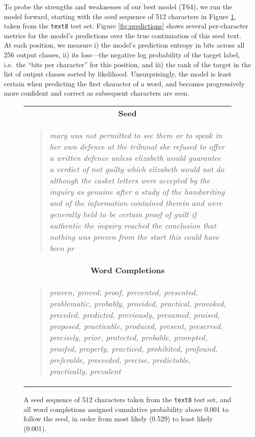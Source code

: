 \documentclass[letterpaper]{article}
\newcommand{\texteight}{\texttt{text8}}
\newcommand{\bigmodel}{\textsc{T64}}
\newcommand{\corpus}[1]{\begin{quote}{\small \emph{#1}}\end{quote}}
\begin{document}
To probe the strengths and weaknesses of our best model (\bigmodel), we run the model forward, starting with the seed sequence of 512 characters in Figure \ref{fig:completions}, taken from the \texteight{} test set.
Figure \ref{fig:predictions} shows several per-character metrics for the model's predictions over the true continuation of this seed text.
At each position, we measure i) the model's prediction entropy in bits across all 256 output classes, ii) its loss---the negative log probability of the target label, i.e.~the ``bits per character'' for this position, and iii) the rank of the target in the list of output classes sorted by likelihood.
Unsurprisingly, the model is least certain when predicting the first character of a word, and becomes progressively more confident and correct as subsequent characters are seen.

\begin{figure}[tb]
\hspace{-15pt}
\begin{tabular}{p{}}
    \multicolumn{1}{c}{\textbf{\small Seed}} \\ \vspace{-8.0pt}
    \corpus{mary was not permitted to see them or to speak in her own defence at the tribunal she refused to offer a written defence unless elizabeth would guarantee a verdict of not guilty which elizabeth would not do although the casket letters were accepted by the inquiry as genuine after a study of the handwriting and of the information contained therein and were generally held to be certain proof of guilt if authentic the inquiry reached the conclusion that nothing was proven from the start this could have been pr} \\
    \multicolumn{1}{c}{\textbf{\small Word Completions}} \\ \vspace{-8.0pt}
    \corpus{proven, proved, proof, prevented, presented, problematic, probably, provided, practical, provoked, preceded, predicted, previously, presumed, praised, proposed, practicable, produced, present, preserved, precisely, prior, protected, probable, prompted, proofed, properly, practiced, prohibited, profound, preferable, proceeded, precise, predictable, practically, prevalent}
\end{tabular}
 \caption{A seed sequence of 512 characters taken from the \texteight{} test set, and all word completions assigned cumulative probability above 0.001 to follow the seed, in order from most likely (0.529) to least likely (0.001).}
 \label{fig:completions}
\end{figure}
\end{document}
